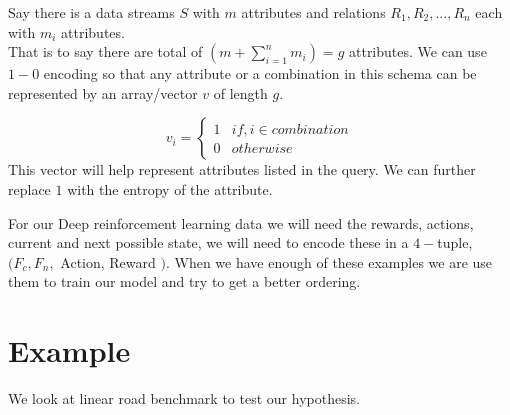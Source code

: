 
\par Say there is a data streams $S$ with $m$ attributes and relations $R_1,R_2,...,R_{n}$ each with $m_{i}$ attributes.
\\ That is to say there are total of $(m + \sum_{i=1}^{n}m_i)=g$ attributes. We can use $1-0$ encoding so that any attribute or a combination in this schema can be represented by an array/vector $v$ of length $g$. 

\[ 
   v_i=
   \begin{cases} 
      1 & if, i \in combination \\
      0 & otherwise 
   \end{cases}
\] 
This vector will help represent attributes listed in the query. We can further replace $1$ with the entropy of the attribute.
\par For our Deep reinforcement learning data we will need the rewards, actions, current and next possible state, we will need to encode these in a $4-$tuple, $(F_c,F_n,$ Action, Reward $)$. When we have enough of these examples we are use them to train our model and try to get a better ordering.

\section{Example}
We look at linear road benchmark to test our hypothesis.

